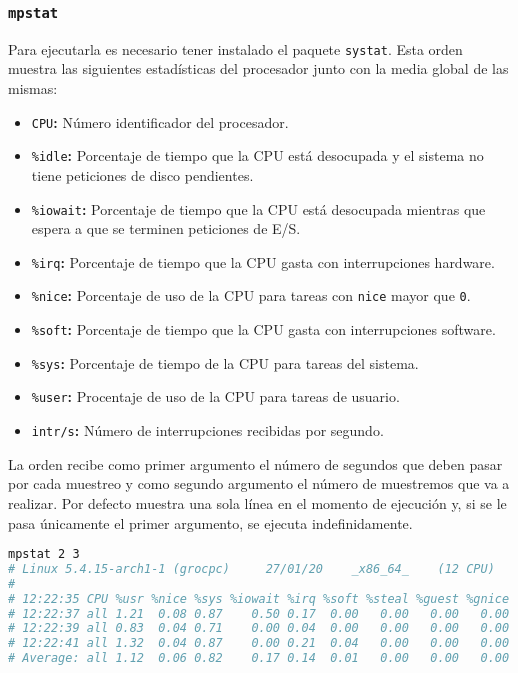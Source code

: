 \subsubsection{\texttt{mpstat}}

Para ejecutarla es necesario tener instalado el paquete \texttt{systat}.
Esta orden muestra las siguientes estadísticas del procesador junto con la media global de las mismas:

\begin{itemize}
	\item\texttt{CPU}\textbf{:} Número identificador del procesador.
	\item\texttt{\%idle}\textbf{:} Porcentaje de tiempo que la CPU está desocupada y el sistema no tiene peticiones de disco pendientes.
	\item\texttt{\%iowait}\textbf{:} Porcentaje de tiempo que la CPU está desocupada mientras que espera a que se terminen peticiones de E/S.
	\item\texttt{\%irq}\textbf{:} Porcentaje de tiempo que la CPU gasta con interrupciones hardware.
	\item\texttt{\%nice}\textbf{:} Porcentaje de uso de la CPU para tareas con \texttt{nice} mayor que \texttt{0}.
	\item\texttt{\%soft}\textbf{:} Porcentaje de tiempo que la CPU gasta con interrupciones software.
	\item\texttt{\%sys}\textbf{:} Porcentaje de tiempo de la CPU para tareas del sistema.
	\item\texttt{\%user}\textbf{:} Procentaje de uso de la CPU para tareas de usuario.
	\item\texttt{intr/s}\textbf{:} Número de interrupciones recibidas por segundo.
\end{itemize}

La orden recibe como primer argumento el número de segundos que deben pasar por cada muestreo y como segundo argumento el número de muestremos que va a realizar.
Por defecto muestra una sola línea en el momento de ejecución y, si se le pasa únicamente el primer argumento, se ejecuta indefinidamente.

\begin{lstlisting}[language=Bash]
mpstat 2 3
# Linux 5.4.15-arch1-1 (grocpc) 	27/01/20 	_x86_64_	(12 CPU)
#
# 12:22:35 CPU %usr %nice %sys %iowait %irq %soft %steal %guest %gnice %idle
# 12:22:37 all 1.21  0.08 0.87    0.50 0.17  0.00   0.00   0.00   0.00 97.17
# 12:22:39 all 0.83  0.04 0.71    0.00 0.04  0.00   0.00   0.00   0.00 98.38
# 12:22:41 all 1.32  0.04 0.87    0.00 0.21  0.04   0.00   0.00   0.00 97.52
# Average: all 1.12  0.06 0.82    0.17 0.14  0.01   0.00   0.00   0.00 97.69
\end{lstlisting}

